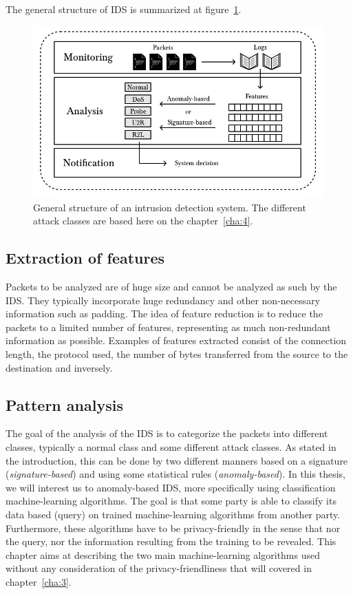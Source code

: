 The general structure of IDS is summarized at figure~\ref{img:ids-model}.

\begin{figure}[t]
    \centering
    \includegraphics[width=.95\textwidth]{parts/chap-2/img-2/ids-model.jpg}
    \caption{General structure of an intrusion detection system. The different attack classes are based here on the chapter~\ref{cha:4}.} 
    \label{img:ids-model}
\end{figure}

\subsection{Extraction of features}
Packets to be analyzed are of huge size and cannot be analyzed as such by the IDS. They typically incorporate huge redundancy and other non-necessary information such as padding. The idea of feature reduction is to reduce the packets to a limited number of features, representing as much non-redundant information as possible. Examples of features extracted consist of the connection length, the protocol used, the number of bytes transferred from the source to the destination and inversely.


\subsection{Pattern analysis}
The goal of the analysis of the IDS is to categorize the packets into different classes, typically a normal class and some different attack classes. As stated in the introduction, this can be done by two different manners based on a signature (\emph{signature-based}) and using some statistical rules (\emph{anomaly-based}). In this thesis, we will interest us to anomaly-based IDS, more specifically using classification machine-learning algorithms. The goal is that some party is able to classify its data based (query) on trained machine-learning algorithms from another party. Furthermore, these algorithms have to be privacy-friendly in the sense that nor the query, nor the information resulting from the training to be revealed. This chapter aims at describing the two main machine-learning algorithms used without any consideration of the privacy-friendliness that will covered in chapter~\ref{cha:3}.

\FloatBarrier